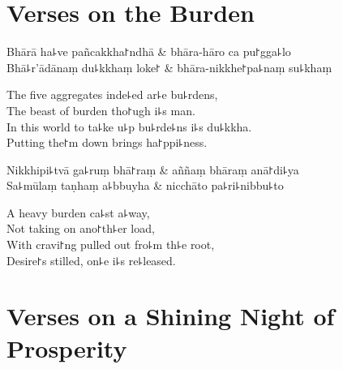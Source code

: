 \clearpage

\chapter{Verses on the Burden}%


\begin{leader}
\end{leader}

\begin{twochants}
Bhārā ha꜕ve pañcakkha꜓ndhā & bhāra-hāro ca pu꜓gga꜕lo \\
Bhā꜕r'ādānaṃ du꜕kkhaṃ loke꜓ & bhāra-nikkhe꜓pa꜕naṃ su꜕khaṃ \\
\end{twochants}

\begin{english}
  The five aggregates inde꜕ed ar꜕e bu꜕rdens,\\
  The beast of burden tho꜓ugh i꜕s man.\\
  In this world to ta꜕ke u꜕p bu꜕rde꜕ns i꜕s du꜕kkha.\\
  Putting the꜓m down brings ha꜓ppi꜕ness.
\end{english}

\begin{twochants}
Nikkhipi꜕tvā ga꜕ruṃ bhā꜓raṃ & aññaṃ bhāraṃ anā꜓di꜕ya \\
Sa꜕mūlaṃ taṇhaṃ a꜕bbuyha & nicchāto pa꜕ri꜕nibbu꜕to \\
\end{twochants}

\begin{english}
  A heavy burden ca꜕st a꜕way,\\
  Not taking on ano꜓th꜕er load,\\
  With cravi꜓ng pulled out fro꜕m th꜕e root,\\
  Desire꜓s stilled, on꜕e i꜕s re꜕leased.
\end{english}

\artoptfalse
\chapter{Verses on a Shining Night of Prosperity}%


\begin{leader}
\end{leader}

